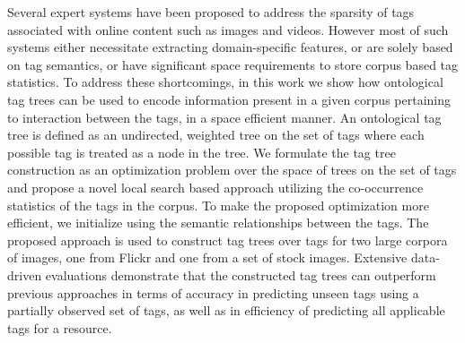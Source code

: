 Several expert systems have been proposed to address the sparsity of tags associated with online content such as images and videos. However most of such systems either necessitate extracting domain-specific features, or are solely based on tag semantics, or have significant space requirements to store corpus based tag statistics. To address these shortcomings, in this work we show how ontological tag trees can be used to encode information present in a given corpus pertaining to interaction between the tags, in a space efficient manner. An ontological tag tree is defined as an undirected, weighted tree on the set of tags where each possible tag is treated as a node in the tree. We formulate the tag tree construction as an optimization problem over the space of trees on the set of tags and propose a novel local search based approach utilizing the co-occurrence statistics of the tags in the corpus. To make the proposed optimization more efficient, we initialize using the semantic relationships between the tags. The proposed approach is used to construct tag trees over tags for two large corpora of images, one from Flickr and one from a set of stock images. Extensive data-driven evaluations demonstrate that the constructed tag trees can outperform previous approaches in terms of accuracy in predicting unseen tags using a partially observed set of tags, as well as in efficiency of predicting all applicable tags for a resource. 









